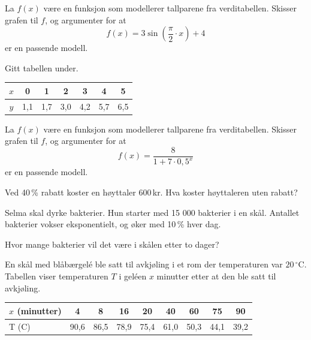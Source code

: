 \vspace{1em}

La $f(x)$ være en funksjon som modellerer tallparene fra verditabellen. Skisser grafen til $f$, og argumenter for at
\[
f(x) = 3 \sin\left(\frac{\pi}{2} \cdot x\right) + 4
\]
er en passende modell.

Gitt tabellen under.

\begin{center}
	\small
	\begin{tabular}{|c|c|c|c|c|c|c|}
		$x$ & 0 & 1 & 2 & 3 & 4 & 5 \\
		\hline
		$y$ & 1{,}1 & 1{,}7 & 3{,}0 & 4{,}2 & 5{,}7 & 6{,}5
	\end{tabular}
\end{center}

\vspace{1em}

La $f(x)$ være en funksjon som modellerer tallparene fra verditabellen. Skisser grafen til $f$, og argumenter for at
\[
f(x) = \frac{8}{1 + 7 \cdot 0{,}5^x}
\]
er en passende modell.

\newpage

Ved 40\,\% rabatt koster en høyttaler 600\,kr. Hva koster høyttaleren uten rabatt?

Selma skal dyrke bakterier. Hun starter med 15 000 bakterier i en skål.
Antallet bakterier vokser eksponentielt, og øker med 10\,\% hver dag. \os

Hvor mange bakterier vil det være i skålen etter to dager?


En skål med blåbærgelé ble satt til avkjøling i et rom der temperaturen var $20\,^\circ$C. Tabellen viser temperaturen $T$ i geléen $x$ minutter etter at den ble satt til avkjøling.
\begin{center}
	\small
	\begin{tabular}{l|c|c|c|c|c|c|c|c}
		$x$ (minutter) & 4 & 8 & 16 & 20 & 40 & 60 & 75 & 90 \\ \hline
		T (\textdegree C) & 90,6 & 86,5 & 78,9 & 75,4 & 61,0 & 50,3 & 44,1 & 39,2
	\end{tabular}
\end{center}

